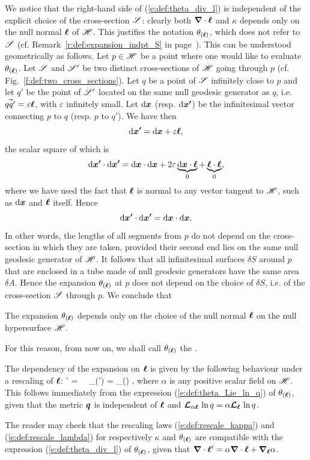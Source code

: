 {We notice that the right-hand side of (\ref{e:def:theta_div_l}) is independent of the
explicit choice of the cross-section $\mathscr{S}$: clearly both $\bm{\nabla}\cdot\bm{\ell}$
and $\kappa$ depends only on the null normal $\bm{\ell}$ of $\mathscr{H}$. This justifies
the notation $\theta_{(\bm{\ell})}$, which does not refer to $\mathscr{S}$
(cf. Remark~\ref{r:def:expansion_indpt_S} in page~\pageref{r:def:expansion_indpt_S}).
This can be understood geometrically as follows. Let $p\in\mathscr{H}$ be a
point where one would like to evaluate $\theta_{(\bm{\ell})}$. Let $\mathscr{S}$ and $\mathscr{S}'$
be two distinct cross-sections of $\mathscr{H}$ going through $p$
(cf. Fig.~\ref{f:def:two_cross_sections}). Let $q$ be a point of $\mathscr{S}$ infinitely close to $p$ and let $q'$
be the point of $\mathscr{S}'$ located on the same null geodesic generator as $q$,
i.e. $\vec{qq'} = \varepsilon \bm{\ell}$, with $\varepsilon$ infinitely small.
Let $\mathrm{d}\bm{x}$ (resp. $\mathrm{d}\bm{x'}$) be the infinitesimal vector connecting
$p$ to $q$ (resp. $p$ to $q'$). We have then
\[
\mathrm{d}\bm{x'} = \mathrm{d}\bm{x} + \varepsilon \bm{\ell} ,
\]
the scalar square of which is
\[
    \mathrm{d}\bm{x'}\cdot\mathrm{d}\bm{x'} =\mathrm{d}\bm{x}\cdot\mathrm{d}\bm{x}
            + 2 \varepsilon \underbrace{\mathrm{d}\bm{x}\cdot \bm{\ell}}_{0}
            + \underbrace{\bm{\ell}\cdot \bm{\ell}}_{0},
\]
where we have used the fact that $\bm{\ell}$ is normal to any vector tangent to $\mathscr{H}$,
such as $\mathrm{d}\bm{x}$ and $\bm{\ell}$ itself. Hence
\[
    \mathrm{d}\bm{x'}\cdot\mathrm{d}\bm{x'} = \mathrm{d}\bm{x}\cdot\mathrm{d}\bm{x} .
\]
In other words, the lengths of all segments from $p$ do not depend
on the cross-section in which they are taken, provided their second end
lies on the same null geodesic generator of $\mathscr{H}$. It follows that all infinitesimal surfaces
$\delta S$ around $p$ that are enclosed in a tube made of null geodesic generators have the same
area $\delta A$. Hence the expansion $\theta_{(\bm{\ell})}$ at $p$
does not depend on the choice of $\delta S$, i.e. of the cross-section
$\mathscr{S}$ through $p$.
We conclude that
\begin{greybox}
The expansion $\theta_{(\bm{\ell})}$ depends only on the choice of the null
normal $\bm{\ell}$ on the null hypersurface $\mathscr{H}$.
\end{greybox}
For this reason, from now on, we shall call $\theta_{(\bm{\ell})}$
the .

The dependency of the expansion on $\bm{\ell}$ is given by the following
behaviour under a rescaling of $\bm{\ell}$:
\be \label{e:def:rescale_lambda}
   \wl' = \alpha \wl \ \Longrightarrow \ \theta_{(\wl')} = \alpha \theta_{(\wl)} ,
\ee
where $\alpha$ is any positive scalar field on $\mathscr{H}$. This follows immediately
from the expression (\ref{e:def:theta_Lie_ln_q}) of $\theta_{(\bm{\ell})}$, given
that the metric $\bm{q}$ is independent of $\bm{\ell}$ and
$\bm{\mathcal{L}}_{\alpha\bm{\ell}}\,\ln q = \alpha \bm{\mathcal{L}}_{\bm{\bm{\ell}}}\,\ln q$.
\begin{remark}
The reader may check that the rescaling laws (\ref{e:def:rescale_kappa})
and (\ref{e:def:rescale_lambda}) for respectively $\kappa$ and $\theta_{(\bm{\ell})}$
are compatible with the expression (\ref{e:def:theta_div_l}) of $\theta_{(\bm{\ell})}$,
given that $\bm{\nabla}\cdot \bm{\ell}' = \alpha\bm{\nabla}\cdot\bm{\ell} + \bm{\nabla}_{\bm{\ell}} \alpha$.
\end{remark}

}
